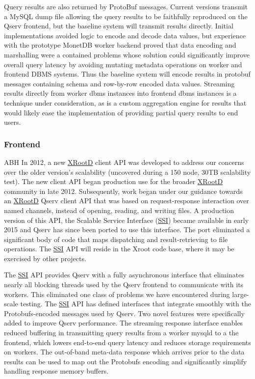 \documentclass[DM,lsstdraft,toc]{lsstdoc}
\begin{document}
Query results are also returned by ProtoBuf messages. Current versions
transmit a MySQL dump file allowing the query results to be faithfully
reproduced on the Qserv frontend, but the baseline system will transmit
results directly. Initial implementations avoided logic to encode and
decode data values, but experience with the prototype MonetDB worker
backend proved that data encoding and marshalling were a contained
problems whose solution could significantly improve overall query
latency by avoiding mutating metadata operations on worker and frontend
DBMS systems. Thus the baseline system will encode results in protobuf
messages containing schema and row-by-row encoded data values. Streaming
results directly from worker dbms instances into frontend dbms instances
is a technique under consideration, as is a custom aggregation engine
for results that would likely ease the implementation of providing
partial query results to end users.

\subsubsection{Frontend}\label{frontend}

ABH In 2012, a new \href{http://xrootd.org}{XRootD} client API was
developed to address our concerns over the older version's scalability
(uncovered during a 150 node, 30TB scalability test). The new client API
began production use for the broader \href{http://xrootd.org}{XRootD}
community in late 2012. Subsequently, work began under our guidance
towards an \href{http://xrootd.org}{XRootD} Qserv client API that was
based on request-response interaction over named channels, instead of
opening, reading, and writing files. A production version of this API,
the Scalable Service Interface (\href{}{SSI}) became available in early
2015 and Qserv has since been ported to use this interface. The port
eliminated a significant body of code that maps dispatching and
result-retrieving to file operations. The \href{}{SSI} API will reside
in the Xroot code base, where it may be exercised by other projects.

The \href{}{SSI} API provides Qserv with a fully asynchronous interface
that eliminates nearly all blocking threads used by the Qserv frontend
to communicate with its workers. This eliminated one class of problems
we have encountered during large-scale testing. The \href{}{SSI} API has
defined interfaces that integrate smoothly with the Protobufs-encoded
messages used by Qserv. Two novel features were specifically added to
improve Qserv performance. The streaming response interface enables
reduced buffering in transmitting query results from a worker mysqld to
a the frontend, which lowers end-to-end query latency and reduces
storage requirements on workers. The out-of-band meta-data response
which arrives prior to the data results can be used to map out the
Protobufs encoding and significantly simplify handling response memory
buffers.
\end{document}
